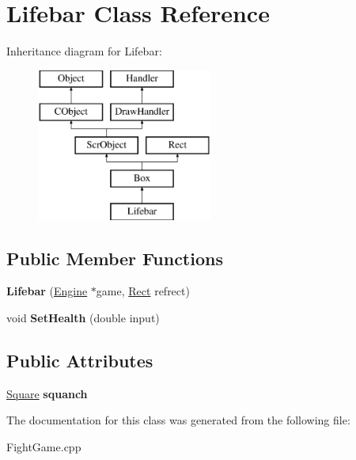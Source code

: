\hypertarget{class_lifebar}{}\section{Lifebar Class Reference}
\label{class_lifebar}
Inheritance diagram for Lifebar\+:\begin{figure}[H]
\begin{center}
\leavevmode
\includegraphics[height=5.000000cm]{class_lifebar}
\end{center}
\end{figure}
\subsection*{Public Member Functions}
\begin{DoxyCompactItemize}
\item 
\hypertarget{class_lifebar_a27922e8a4be8396e1e68ec4ca03b1874}{}\label{class_lifebar_a27922e8a4be8396e1e68ec4ca03b1874} 
{\bfseries Lifebar} (\hyperlink{class_engine}{Engine} $\ast$game, \hyperlink{class_rect}{Rect} refrect)
\item 
\hypertarget{class_lifebar_a0a904e4004820e0d1c0cb5152e69cfbf}{}\label{class_lifebar_a0a904e4004820e0d1c0cb5152e69cfbf} 
void {\bfseries Set\+Health} (double input)
\end{DoxyCompactItemize}
\subsection*{Public Attributes}
\begin{DoxyCompactItemize}
\item 
\hypertarget{class_lifebar_a1fd0dcdaba628c269d0c26301605d2ff}{}\label{class_lifebar_a1fd0dcdaba628c269d0c26301605d2ff} 
\hyperlink{class_square}{Square} {\bfseries squanch}
\end{DoxyCompactItemize}


The documentation for this class was generated from the following file\+:\begin{DoxyCompactItemize}
\item 
Fight\+Game.\+cpp\end{DoxyCompactItemize}
